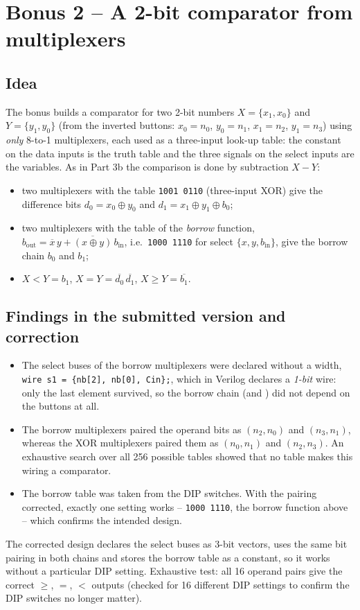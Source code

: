 \section{Bonus 2 -- A 2-bit comparator from multiplexers}
\subsection{Idea}
The bonus builds a comparator for two 2-bit numbers $X=\{x_1,x_0\}$ and $Y=\{y_1,y_0\}$ (from the
inverted buttons: $x_0=n_0$, $y_0=n_1$, $x_1=n_2$, $y_1=n_3$) using \emph{only} 8-to-1 multiplexers, each
used as a three-input look-up table: the constant on the data inputs is the truth table and the three
signals on the select inputs are the variables. As in Part 3b the comparison is done by subtraction
$X-Y$:
\begin{itemize}
  \item two multiplexers with the table \texttt{1001\,0110} (three-input XOR) give the difference bits
        $d_0 = x_0\oplus y_0$ and $d_1 = x_1\oplus y_1\oplus b_0$;
  \item two multiplexers with the table of the \emph{borrow} function,
        $b_\text{out} = \overline{x}\,y + \overline{(x\oplus y)}\,b_\text{in}$, i.e.\ \texttt{1000\,1110}
        for select $\{x,y,b_\text{in}\}$, give the borrow chain $b_0$ and $b_1$;
  \item $X<Y = b_1$, \quad $X=Y = \overline{d_0}\,\overline{d_1}$, \quad $X\geq Y = \overline{b_1}$.
\end{itemize}

\subsection{Findings in the submitted version and correction}
\begin{itemize}
  \item The select buses of the borrow multiplexers were declared without a width,
        \texttt{wire s1 = \{nb[2], nb[0], Cin\};}, which in Verilog declares a \emph{1-bit} wire: only the last
        element survived, so the borrow chain (and ) did not depend on the buttons at all.
  \item The borrow multiplexers paired the operand bits as $(n_2,n_0)$ and $(n_3,n_1)$, whereas the XOR
        multiplexers paired them as $(n_0,n_1)$ and $(n_2,n_3)$. An exhaustive search over all 256
        possible tables showed that no table makes this wiring a comparator.
  \item The borrow table was taken from the DIP switches. With the pairing corrected, exactly one
        setting works -- \texttt{1000\,1110}, the borrow function above -- which confirms the intended design.
\end{itemize}
The corrected design declares the select buses as 3-bit vectors, uses the same bit pairing in both
chains and stores the borrow table as a constant, so it works without a particular DIP setting.
Exhaustive test: all 16 operand pairs give the correct $\geq$, $=$, $<$ outputs (checked for 16 different
DIP settings to confirm the DIP switches no longer matter).

